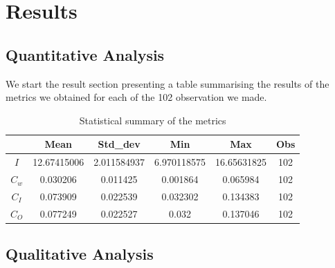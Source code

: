 \documentclass[12pt, a4paper]{article}
\begin{document}
\section{Results}
\subsection{Quantitative Analysis}
\label{quantitative-analysis}
We start the result section presenting a table summarising the results of the metrics we obtained for each of the 102 observation we made. \\
\begin{table}[h]
        \centering
        \begin{tabular}{|c|c|c|c|c|c|}
                \hline
                & Mean & Std\_dev & Min & Max & Obs \\
                \hline
                $I$  &  12.67415006 & 2.011584937 & 6.970118575 &16.65631825 &  102 \\
                \hline
                $C_w$  &  0.030206  &  0.011425 & 0.001864 & 0.065984 & 102 \\
                \hline
                $C_I$ & 0.073909 & 0.022539 & 0.032302 & 0.134383 & 102 \\
                \hline
                $C_O$ & 0.077249 & 0.022527 & 0.032 & 0.137046 & 102 \\
                \hline
        \end{tabular}
        \caption{Statistical summary of the metrics}
\end{table}

\subsection{Qualitative Analysis}
\label{qualitative-analysis}
\end{document}
